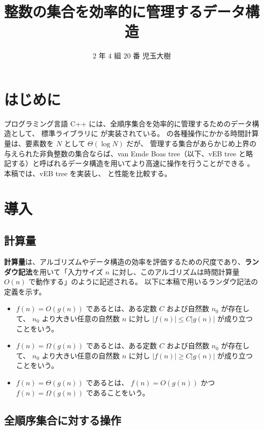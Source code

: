 \documentclass[dvipdfmx,a4j,10pt]{jarticle}
\begin{document}
\title{整数の集合を効率的に管理するデータ構造}
\author{$2$ 年 $4$ 組 $20$ 番 児玉大樹}
\date{}
\maketitle

\section{はじめに}

プログラミング言語 C++ には、全順序集合を効率的に管理するためのデータ構造として、
標準ライブラリに  が実装されている。
 の各種操作にかかる時間計算量は、要素数を $N$ として $\Theta (\log N)$ だが、
管理する集合があらかじめ上界の与えられた非負整数の集合ならば、van Emde Boas tree（以下、vEB tree と略記する）と呼ばれるデータ構造を用いてより高速に操作を行うことができる \cite{AlgorithmIntroduction}。
本稿では、vEB tree を実装し、 と性能を比較する。

\section{導入}

\subsection{計算量}

\textbf{計算量}は、アルゴリズムやデータ構造の効率を評価するための尺度であり、\textbf{ランダウ記法}を用いて「入力サイズ $n$ に対し、このアルゴリズムは時間計算量 $O(n)$ で動作する」のように記述される。
以下に本稿で用いるランダウ記法の定義を示す。

\begin{itemize}
  \item 
    $f(n) = O(g(n))$ であるとは、ある定数 $C$ および自然数 $n_0$ が存在して、
    $n_0$ より大きい任意の自然数 $n$ に対し $|f(n)| \leq C|g(n)|$ が成り立つことをいう。
  \item 
    $f(n) = \Omega(g(n))$ であるとは、ある定数 $C$ および自然数 $n_0$ が存在して、
    $n_0$ より大きい任意の自然数 $n$ に対し $|f(n)| \geq C|g(n)|$ が成り立つことをいう。
  \item 
    $f(n) = \Theta(g(n))$ であるとは、
    $f(n) = O(g(n))$ かつ $f(n) = \Omega(g(n))$ であることをいう。
\end{itemize}

\subsection{全順序集合に対する操作}
\end{document}
